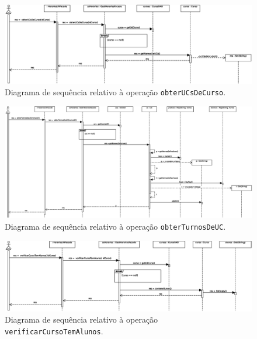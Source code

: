 \documentclass[12pt, a4paper]{article}
\begin{document}
\begin{landscape}
        \begin{figure}[H]
            \centering
            \includegraphics[scale=0.75]{Imagens/Modelos/obterUCsDeCursoDAO.svg.eps}
            \caption{
                Diagrama de sequência relativo à operação \texttt{obterUCsDeCurso}.
            }
        \end{figure}

        \vspace*{\fill}
        \pagebreak
        \vspace*{\fill}

        \begin{figure}[H]
            \centering
            \includegraphics[scale=0.60]{Imagens/Modelos/obterTurnosDeUCDAO.svg.eps}
            \caption{
                Diagrama de sequência relativo à operação \texttt{obterTurnosDeUC}.
            }
        \end{figure}

        \vspace*{\fill}
        \pagebreak
        \vspace*{\fill}

        \begin{figure}[H]
            \centering
            \includegraphics[scale=0.75]{Imagens/Modelos/verificarCursoTemAlunosDAO.svg.eps}
            \caption{
                Diagrama de sequência relativo à operação \texttt{verificarCursoTemAlunos}.
            }
        \end{figure}


\end{landscape}
\end{document}
